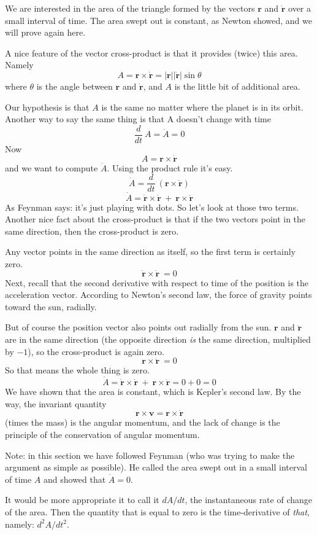 \documentclass[11pt, oneside]{article}
\begin{document}
We are interested in the area of the triangle formed by the vectors $\mathbf{r}$ and $\dot{\mathbf{r}}$ over a small interval of time.  The area swept out is constant, as Newton showed, and we will prove again here.

A nice feature of the vector cross-product is that it provides (twice) this area.  Namely
\[ A =  \mathbf{r} \times \dot{\mathbf{r}} = |\mathbf{r}| |\dot{\mathbf{r}}| \sin \theta   \]
where $\theta$ is the angle between $\mathbf{r}$ and $\dot{\mathbf{r}}$, and $A$ is the little bit of additional area.

Our hypothesis is that $A$ is the same no matter where the planet is in its orbit.  Another way to say the same thing is that A doesn't change with time
\[ \frac{d}{dt} \ A = \dot A = 0 \]
Now 
\[ A = \mathbf{r} \times \dot{\mathbf{r}} \]
and we want to compute $\dot A$.  Using the product rule it's easy.
\[ \dot A = \frac{d}{dt} \ (\mathbf{r} \times \dot{\mathbf{r}}) \]
\[ \dot A = \dot{\mathbf{r}} \times \dot{\mathbf{r}} \ + \ \mathbf{r} \times \ddot{\mathbf{r}} \]
As Feynman says: it's just playing with dots.  So let's look at those two terms.  Another nice fact about the cross-product is that if the two vectors point in the same direction, then the cross-product is zero.

Any vector points in the same direction as itself, so the first term is certainly zero.  
\[ \dot{\mathbf{r}} \times \dot{\mathbf{r}} \ = 0 \]
Next, recall that the second derivative with respect to time of the position is the acceleration vector.  According to Newton's second law, the force of gravity points toward the sun, radially.  

But of course the position vector also points out radially from the sun.  $\mathbf{r}$ and $\ddot{\mathbf{r}}$ are in the same direction (the opposite direction \emph{is} the same direction, multiplied by $-1$), so the cross-product is again zero.
\[ \mathbf{r} \times \ddot{\mathbf{r}} \ = 0 \]
So that means the whole thing is zero.
\[ \dot A = \dot{\mathbf{r}} \times \dot{\mathbf{r}} \ + \ \mathbf{r} \times \ddot{\mathbf{r}} = 0 + 0 = 0  \]
We have shown that the area is constant, which is Kepler's second law.  By the way, the invariant quantity 
\[ \mathbf{r} \times \mathbf{v} = \mathbf{r} \times \dot{\mathbf{r}} \]
(times the mass) is the angular momentum, and the lack of change is the principle of the conservation of angular momentum.

Note:  in this section we have followed Feynman (who was trying to make the argument as simple as possible).  He called the area swept out in a small interval of time $A$ and showed that $\dot{A} = 0$.  

It would be more appropriate it to call it $dA/dt$, the instantaneous rate of change of the area.  Then the quantity that is equal to zero is the time-derivative of \emph{that}, namely:  $d^2A/dt^2$.
\end{document}
